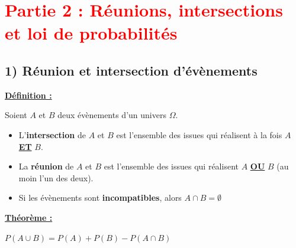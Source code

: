 \documentclass[12pt]{article}
\begin{document}
\vspace{10pt}


\section*{\textcolor{red}{Partie 2 : Réunions, intersections et loi de probabilités}}

\subsection*{\hspace{1cm} 1) Réunion et intersection d'évènements}

\begin{mdframed}[
    linewidth=1pt,
    roundcorner=5pt,
    linecolor=ForestGreen,
    innertopmargin=10pt,
    innerbottommargin=10pt
]
{\color{ForestGreen}
\textbf{\underline{Définition :}}}

\vspace{5pt}
Soient $A$ et $B$ deux évènements d'un univers $\Omega$.

\begin{itemize}
    \item L'\textbf{intersection} de $A$ et $B$ est l'ensemble des issues qui réalisent à la fois $A$ 
    \textbf{\underline{ET}} $B$.
    \item La \textbf{réunion} de $A$ et $B$ est l'ensemble des issues qui réalisent $A$ 
    \textbf{\underline{OU}} $B$ (au moin l'un des deux).
    \item Si les évènements sont \textbf{incompatibles}, alors $A \cap B = \emptyset$
\end{itemize}

\end{mdframed}

\begin{mdframed}[
    linewidth=1pt,
    roundcorner=5pt,
    linecolor=Red,
    innertopmargin=10pt,
    innerbottommargin=0pt
]
{\color{red}
\textbf{\underline{Théorème :}}

\vspace{-10pt}
\begin{center}
    $P(A \cup B) = P(A) + P(B) - P(A \cap B)$
\end{center}

}
\end{mdframed}
\end{document}
